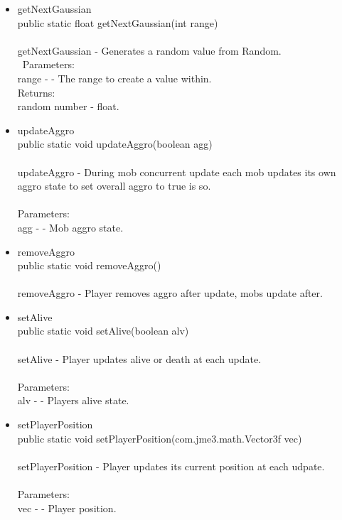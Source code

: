 \documentclass[letterpaper]{article}
\begin{document}
\begin{itemize}
\begin{itemize}
													\item	getNextGaussian \\
															public static float getNextGaussian(int range) \\ \\
															getNextGaussian - Generates a random value from Random. \\ \
															Parameters: \\
															range - - The range to create a value within. \\
															Returns: \\
															random number - float. \\
													\item	updateAggro \\
															public static void updateAggro(boolean agg) \\ \\
															updateAggro - During mob concurrent update each mob updates its own aggro state to set overall aggro to true is so. \\ \\
															Parameters: \\
															agg - - Mob aggro state. \\
													\item	removeAggro \\
															public static void removeAggro() \\ \\
															removeAggro - Player removes aggro after update, mobs update after. \\
													\item	setAlive \\
															public static void setAlive(boolean alv) \\ \\
															setAlive - Player updates alive or death at each update. \\ \\
															Parameters: \\
															alv - - Players alive state.
													\item	setPlayerPosition \\
															public static void setPlayerPosition(com.jme3.math.Vector3f vec) \\ \\
															setPlayerPosition - Player updates its current position at each udpate. \\ \\
															Parameters: \\
															vec - - Player position.
												\end{itemize}
									\end{itemize}
								
\end{document}
